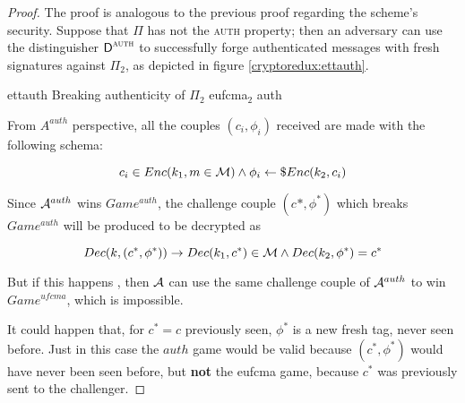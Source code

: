 \begin{proof}
    The proof is analogous to the previous proof regarding the scheme's \cpa{} security. Suppose that $\Pi$ has not the \textsc{auth} property; then an adversary can use the distinguisher $\textsf{D}^{\textsc{auth}}$ to successfully forge authenticated messages with fresh signatures against $\Pi_2$, as depicted in figure \ref{cryptoredux:ettauth}.
    
    \begin{cryptoredux}
        {ettauth}
        {Breaking authenticity of $\Pi_2$}
        {eufcma$_2$}
        {auth}

        \cseqbeginloop


        \cseqendloop

        \cseqdelay


    \end{cryptoredux}

From $A^{auth}$ perspective, all the couples $(c_{i}, \phi_{i})$ received are made with the following schema:

\begin{equation*}
    c_{i} \in Enc(k_{1}, m \in \mathcal{M}) \wedge \phi_{i}\leftarrow\$ Enc(k_{2}, c_{i})
\end{equation*}

Since $\mathcal{A}^{auth}$ wins $Game^{auth}$, the challenge couple $(c^{}{*}, \phi^{*})$ which breaks $Game^{auth}$ will be produced to be decrypted as

\begin{equation*}
    Dec(k, (c^{*}, \phi^{*})) \rightarrow Dec(k_{1}, c^{*}) \in \mathcal{M} \wedge
    Dec(k_{2}, \phi^{*})=c^{*}
\end{equation*}

But if this happens , then $\mathcal{A}$ can use the same challenge couple of $\mathcal{A}^{auth}$ to win $Game^{ufcma}$, which is impossible.

It could happen that, for $c^{*}=c$ previously seen, $\phi^{*}$ is a new fresh tag, never seen before. Just in this case the $auth$ game would be valid because $(c^{*}, \phi^{*})$ would have never been seen before, but \textbf{not } the eufcma game, because $c^{*}$ was previously sent to the challenger.
\end{proof}
    
